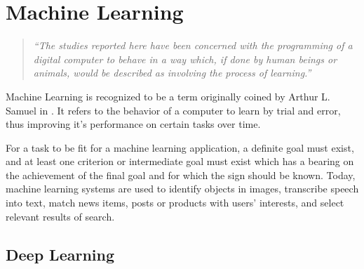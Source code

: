 \section{Machine Learning}
\begin{quotation}
	\emph{``The studies reported here have been concerned with the
			programming of a digital computer to behave in a way
			which, if done by human beings or animals, would be
			described as involving the process of learning.''}
	\citep{samuel_machinelearning}
\end{quotation} 

Machine Learning is recognized to be a term originally coined by Arthur L. Samuel in \cite{samuel_machinelearning}. It refers to the behavior of a computer to learn by trial and error, thus improving it's performance on certain tasks over time.

For a task to be fit for a machine learning application, a definite goal must exist, and at least one criterion or intermediate goal must exist which has a bearing on the achievement of the final goal and for which the sign should be known. \citep{samuel_machinelearning} Today, machine learning systems are used to identify objects in images, transcribe speech into text, match news items, posts or products with users’ interests, and select relevant results of search. \citep{deeplearning}



\subsection{Deep Learning}







